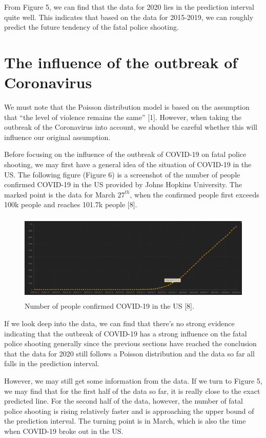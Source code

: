 \documentclass[a4paper]{article}
\begin{document}
    From Figure 5, we can find that the data for 2020 lies in the prediction interval quite well. This indicates that based on the data for 2015-2019, we can roughly predict the future tendency of the fatal police shooting.

\section{The influence of the outbreak of Coronavirus}

	We must note that the Poisson distribution model is based on the assumption that “the level of violence remains the same” [1]. However, when taking the outbreak of the Coronavirus into account, we should be careful whether this will influence our original assumption.
	
	Before focusing on the influence of the outbreak of COVID-19 on fatal police shooting, we may first have a general idea of the situation of COVID-19 in the US. The following figure (Figure 6) is a screenshot of the number of people confirmed COVID-19 in the US provided by Johns Hopkins University. The marked point is the data for March $27^{th}$, when the confirmed people first exceeds 100k people and reaches 101.7k people [8].
	
	\begin{figure}[H]
	\centering
	\includegraphics[width=122.2mm,height=42.3mm]{covid19.jpg}
	\caption{Number of people confirmed COVID-19 in the US [8].}
	\end{figure}
	
	If we look deep into the data, we can find that there's no strong evidence indicating that the outbreak of COVID-19 has a strong influence on the fatal police shooting generally since the previous sections have reached the conclusion that the data for 2020 still follows a Poisson distribution and the data so far all falls in the prediction interval.
	
	However, we may still get some information from the data. If we turn to Figure 5, we may find that for the first half of the data so far, it is really close to the exact predicted line. For the second half of the data, however, the number of fatal police shooting is rising relatively faster and is approaching the upper bound of the prediction interval. The turning point is in March, which is also the time when COVID-19 broke out in the US.
	
\end{document}
